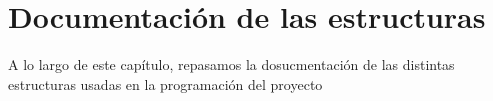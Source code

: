 
\chapter{Documentación de las estructuras}
A lo largo de este capítulo, repasamos la dosucmentación de las distintas estructuras usadas en la programación del 
proyecto

\newenvironment{DoxyCompactItemize}{%
  \begin{itemize}%
    \setlength{\itemsep}{-3pt}%
    \setlength{\parsep}{0pt}%
    \setlength{\topsep}{0pt}%
    \setlength{\partopsep}{0pt}%
}{%
  \end{itemize}%
}


















